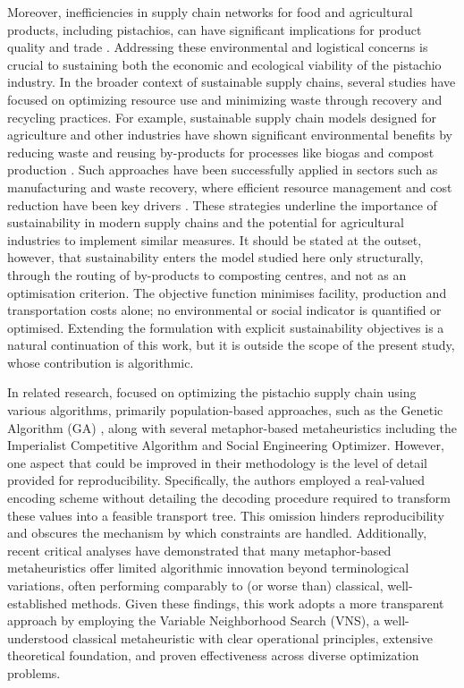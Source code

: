 \documentclass[preprint,12pt,authoryear]{elsarticle}
\begin{document}
Moreover, inefficiencies in supply chain networks for food and agricultural products, including pistachios, can have significant 
implications for product quality and trade \citep{casper2018}. Addressing these environmental and logistical concerns is crucial to sustaining both 
the economic and ecological viability of the pistachio industry.  In the broader context of sustainable supply chains, several studies have focused on 
optimizing resource use and minimizing waste through recovery and recycling practices. For example, sustainable supply chain models designed for 
agriculture and other industries have shown significant environmental benefits by reducing waste and reusing by-products for processes like 
biogas and compost production \citep{cheraghalipour2022}. Such approaches have been successfully applied in sectors such as manufacturing 
and waste recovery, where efficient resource management and cost reduction have been key drivers \citep{devika2014, zohal2016}. 
These strategies underline the importance of sustainability in modern supply chains and the potential for agricultural industries to implement similar measures.
It should be stated at the outset, however, that sustainability enters the model studied here only structurally, through the routing of by-products to composting
centres, and not as an optimisation criterion. The objective function minimises facility, production and transportation costs alone; no environmental or social
indicator is quantified or optimised. Extending the formulation with explicit sustainability objectives is a natural continuation of this work, but it is outside
the scope of the present study, whose contribution is algorithmic.

In related research, \cite{rajabi2023} focused on optimizing the pistachio supply chain using various algorithms, primarily population-based 
approaches, such as the Genetic Algorithm (GA) \citep{fathollahi2018, xie2022}, along with several metaphor-based metaheuristics including the Imperialist Competitive 
Algorithm and Social Engineering Optimizer. However, one aspect that could be improved in their methodology is the level of detail provided for reproducibility. 
Specifically, the authors employed a real-valued encoding scheme without detailing the decoding procedure required to transform these values into a feasible transport tree. 
This omission hinders reproducibility and obscures the mechanism by which constraints are handled. Additionally, recent critical analyses \citep{campelo2023, aranha2022}
have demonstrated that many metaphor-based metaheuristics offer limited algorithmic innovation beyond terminological variations, often performing comparably to (or worse than) classical, 
well-established methods. Given these findings, this work adopts a more transparent approach by employing the Variable Neighborhood Search (VNS), a well-understood classical metaheuristic 
with clear operational principles, extensive theoretical foundation, and proven effectiveness across diverse optimization problems.
\end{document}
